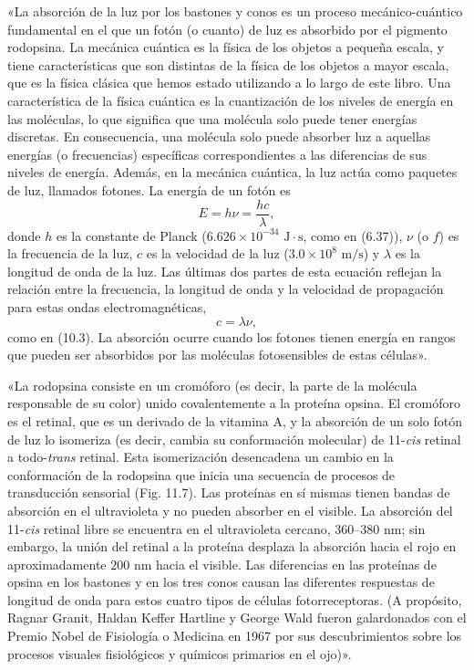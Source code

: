 \documentclass[12pt]{book}
\begin{document}
«La absorción de la luz por los bastones y conos es un proceso mecánico-cuántico fundamental en el que un fotón (o cuanto) de luz es absorbido por el pigmento rodopsina. La mecánica cuántica es la física de los objetos a pequeña escala, y tiene características que son distintas de la física de los objetos a mayor escala, que es la física clásica que hemos estado utilizando a lo largo de este libro. Una característica de la física cuántica es la cuantización de los niveles de energía en las moléculas, lo que significa que una molécula solo puede tener energías discretas. En consecuencia, una molécula solo puede absorber luz a aquellas energías (o frecuencias) específicas correspondientes a las diferencias de sus niveles de energía. Además, en la mecánica cuántica, la luz actúa como paquetes de luz, llamados fotones. La energía de un fotón es
\begin{equation}
E = h\nu = \frac{hc}{\lambda}, \label{eq:11.1}
\end{equation}
donde $h$ es la constante de Planck ($6.626 \times 10^{-34}\text{ J}\cdot\text{s}$, como en (6.37)), $\nu$ (o $f$) es la frecuencia de la luz, $c$ es la velocidad de la luz ($3.0 \times 10^8\text{ m/s}$) y $\lambda$ es la longitud de onda de la luz. Las últimas dos partes de esta ecuación reflejan la relación entre la frecuencia, la longitud de onda y la velocidad de propagación para estas ondas electromagnéticas,
\begin{equation}
c = \lambda\nu, \label{eq:11.2}
\end{equation}
como en (10.3). La absorción ocurre cuando los fotones tienen energía en rangos que pueden ser absorbidos por las moléculas fotosensibles de estas células».

«La rodopsina consiste en un cromóforo (es decir, la parte de la molécula responsable de su color) unido covalentemente a la proteína opsina. El cromóforo es el retinal, que es un derivado de la vitamina A, y la absorción de un solo fotón de luz lo isomeriza (es decir, cambia su conformación molecular) de 11-\emph{cis} retinal a todo-\emph{trans} retinal. Esta isomerización desencadena un cambio en la conformación de la rodopsina que inicia una secuencia de procesos de transducción sensorial (Fig. 11.7). Las proteínas en sí mismas tienen bandas de absorción en el ultravioleta y no pueden absorber en el visible. La absorción del 11-\emph{cis} retinal libre se encuentra en el ultravioleta cercano, $360\text{--}380\text{ nm}$; sin embargo, la unión del retinal a la proteína desplaza la absorción hacia el rojo en aproximadamente $200\text{ nm}$ hacia el visible. Las diferencias en las proteínas de opsina en los bastones y en los tres conos causan las diferentes respuestas de longitud de onda para estos cuatro tipos de células fotorreceptoras. (A propósito, Ragnar Granit, Haldan Keffer Hartline y George Wald fueron galardonados con el Premio Nobel de Fisiología o Medicina en 1967 por sus descubrimientos sobre los procesos visuales fisiológicos y químicos primarios en el ojo)».
\end{document}
